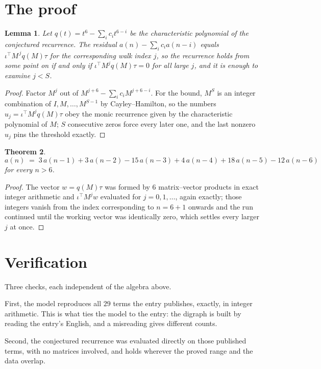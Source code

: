 \documentclass[11pt,a4paper]{article}
\theoremstyle{plain}
\newtheorem{theorem}{Theorem}
\newtheorem{lemma}[theorem]{Lemma}
\theoremstyle{definition}
\begin{document}
\section{The proof}

\begin{lemma}\label{lem:crit}
Let $q(t)=t^{6}-\sum_i c_it^{6-i}$ be the characteristic polynomial of the
conjectured recurrence. The residual $a(n)-\sum_ic_ia(n-i)$ equals
$\iota^{\!\top}M^{\,j}q(M)\tau$ for the corresponding walk index $j$, so the recurrence
holds from some point on if and only if $\iota^{\!\top}M^{j}q(M)\tau=0$ for all large $j$,
and it is enough to examine $j<S$.
\end{lemma}

\begin{proof}
Factor $M^{j}$ out of $M^{j+6}-\sum_ic_iM^{j+6-i}$. For the bound, $M^{S}$
is an integer combination of $I,M,\dots,M^{S-1}$ by Cayley--Hamilton, so the numbers
$u_j=\iota^{\!\top}M^{j}q(M)\tau$ obey the monic recurrence given by the characteristic
polynomial of $M$; $S$ consecutive zeros force every later one, and the last nonzero $u_j$
pins the threshold exactly.
\end{proof}

\begin{theorem}
\[
a(n)\;=\;3\,a(n-1) + 3\,a(n-2) - 15\,a(n-3) + 4\,a(n-4) + 18\,a(n-5) - 12\,a(n-6)
\]
for every $n>6$.
\end{theorem}

\begin{proof}
The vector $w=q(M)\tau$ was formed by $6$ matrix--vector products in exact integer
arithmetic and $\iota^{\!\top}M^{j}w$ evaluated for $j=0,1,\dots$, again exactly; those
integers vanish from the index corresponding to $n=6+1$ onwards and the run continued
until the working vector was identically zero, which settles every larger $j$ at once.
\end{proof}

\section{Verification}

Three checks, each independent of the algebra above.

First, the model reproduces all $29$ terms the entry publishes, exactly, in integer
arithmetic. This is what ties the model to the entry: the digraph is built by reading the
entry's English, and a misreading gives different counts.

Second, the conjectured recurrence was evaluated directly on those published terms, with no
matrices involved, and holds wherever the proved range and the data overlap.
\end{document}
